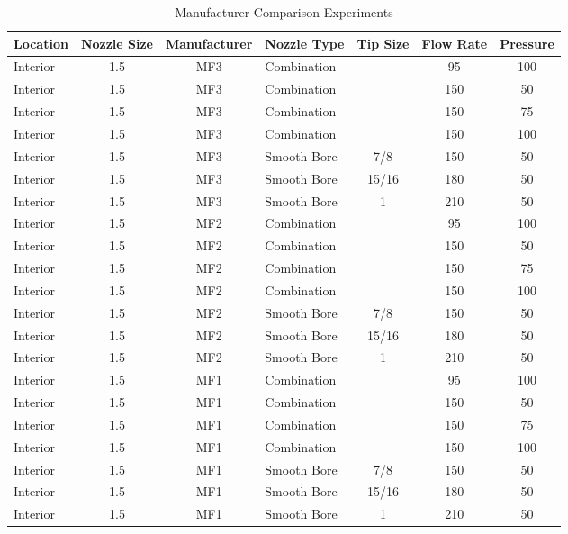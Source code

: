 \documentclass{article}
\begin{document}
\begin{table}[!ht]
\centering
\begin{tabular}{|lcclccc|}
\hline
\multicolumn{1}{|c|}{\textbf{Location}} & \multicolumn{1}{c|}{\textbf{Nozzle Size}} & \multicolumn{1}{c|}{\textbf{Manufacturer}} & \multicolumn{1}{c|}{\textbf{Nozzle Type}} & \multicolumn{1}{c|}{\textbf{Tip Size}} & \multicolumn{1}{c|}{\textbf{Flow Rate}} & \textbf{Pressure} \\ \hline
Interior & 1.5 & MF3 & Combination &  & 95 & 100 \\
Interior & 1.5 & MF3 & Combination &  & 150 & 50 \\
Interior & 1.5 & MF3 & Combination &  & 150 & 75 \\
Interior & 1.5 & MF3 & Combination &  & 150 & 100 \\
Interior & 1.5 & MF3 & Smooth Bore & 7/8 & 150 & 50 \\
Interior & 1.5 & MF3 & Smooth Bore & 15/16 & 180 & 50 \\
Interior & 1.5 & MF3 & Smooth Bore & 1 & 210 & 50 \\
Interior & 1.5 & MF2 & Combination &  & 95 & 100 \\
Interior & 1.5 & MF2 & Combination &  & 150 & 50 \\
Interior & 1.5 & MF2 & Combination &  & 150 & 75 \\
Interior & 1.5 & MF2 & Combination &  & 150 & 100 \\
Interior & 1.5 & MF2 & Smooth Bore & 7/8 & 150 & 50 \\
Interior & 1.5 & MF2 & Smooth Bore & 15/16 & 180 & 50 \\
Interior & 1.5 & MF2 & Smooth Bore & 1 & 210 & 50 \\
Interior & 1.5 & MF1 & Combination &  & 95 & 100 \\
Interior & 1.5 & MF1 & Combination &  & 150 & 50 \\
Interior & 1.5 & MF1 & Combination &  & 150 & 75 \\
Interior & 1.5 & MF1 & Combination &  & 150 & 100 \\
Interior & 1.5 & MF1 & Smooth Bore & 7/8 & 150 & 50 \\
Interior & 1.5 & MF1 & Smooth Bore & 15/16 & 180 & 50 \\
Interior & 1.5 & MF1 & Smooth Bore & 1 & 210 & 50 \\ \hline
\end{tabular}
\caption{Manufacturer Comparison Experiments}
\label{Manufacturer_Comparison_Experiments}
\end{table}
\end{document}
